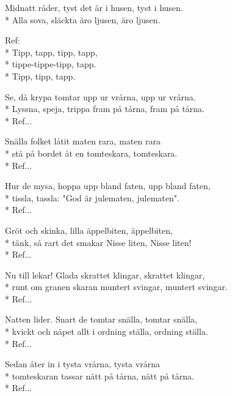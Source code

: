\begin{SongText}
    \begin{SongVerse}
        Midnatt råder, tyst det är i husen, tyst i husen.\\*%
        Alla sova, släckta äro ljusen, äro ljusen.
    \end{SongVerse}
    \begin{SongVerse}
        Ref:\\*%
        Tipp, tapp, tipp, tapp,\\*%
        tippe-tippe-tipp, tapp.\\*%
        Tipp, tipp, tapp.
    \end{SongVerse}
    \begin{SongVerse}
        Se, då krypa tomtar upp ur vrårna, upp ur vrårna.\\*%
        Lyssna, speja, trippa fram på tårna, fram på tårna.\\*%
        Ref...
    \end{SongVerse}
    \begin{SongVerse}
        Snälla folket låtit maten rara, maten rara\\*%
        stå på bordet åt en tomteskara, tomteskara.\\*%
        Ref...
    \end{SongVerse}
    \begin{SongVerse}
        Hur de mysa, hoppa upp bland faten, upp bland faten,\\*%
        tissla, tassla: "God är julematen, julematen".\\*%
        Ref...
    \end{SongVerse}
    \begin{SongVerse}
        Gröt och skinka, lilla äppelbiten, äppelbiten,\\*%
        tänk, så rart det smakar Nisse liten, Nisse liten!\\*%
        Ref...
    \end{SongVerse}
    \begin{SongVerse}
        Nu till lekar! Glada skrattet klingar, skrattet klingar,\\*%
        runt om granen skaran muntert svingar, muntert svingar.\\*%
        Ref...
    \end{SongVerse}
    \begin{SongVerse}
        Natten lider. Snart de tomtar snälla, tomtar snälla,\\*%
        kvickt och näpet allt i ordning ställa, ordning ställa.\\*%
        Ref...
    \end{SongVerse}
    \begin{SongVerse}
        Sedan åter in i tysta vrårna, tysta vrårna\\*%
        tomteskaran tassar nätt på tårna, nätt på tårna.\\*%
        Ref...
    \end{SongVerse}
    \begin{SongVerse}
    \end{SongVerse}
\end{SongText}